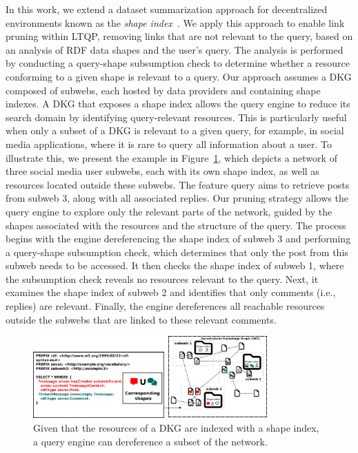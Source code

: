 In this work, we extend a dataset summarization approach for decentralized environments known as the \emph{shape index}~\cite{tam2024opportunitiesshapebasedoptimizationlink}.
We apply this approach to enable link pruning within LTQP, removing links that are not relevant to the query, based on an analysis of RDF data shapes and the user's query.
The analysis is performed by conducting a query-shape subsumption check to determine whether a resource conforming to a given shape is relevant to a query.
Our approach assumes a DKG composed of subwebs, each hosted by data providers and containing shape indexes.
A DKG that exposes a shape index allows the query engine to reduce its search domain by identifying query-relevant resources.
This is particularly useful when only a subset of a DKG is relevant to a given query, for example, in social media applications, where it is rare to query all information about a user.
To illustrate this, we present the example in Figure~\ref{fig:dkg}, which depicts a network of three social media user subwebs, each with its own shape index, as well as resources located outside these subwebs.
The feature query aims to retrieve posts from subweb 3, along with all associated replies.
Our pruning strategy allows the query engine to explore only the relevant parts of the network, guided by the shapes associated with the resources and the structure of the query.
The process begins with the engine dereferencing the shape index of subweb 3 and performing a query-shape subsumption check, which determines that only the post from this subweb needs to be accessed.  
It then checks the shape index of subweb 1, where the subsumption check reveals no resources relevant to the query.  
Next, it examines the shape index of subweb 2 and identifies that only comments (i.e., replies) are relevant.  
Finally, the engine dereferences all reachable resources outside the subwebs that are linked to these relevant comments.

\begin{figure}
   \centering
   \includegraphics[width=0.80\textwidth]{figure/dkg.png}
   \caption{
      Given that the resources of a DKG are indexed with a shape index, a query engine can dereference a subset of the network.
    }
    \label{fig:dkg}
\end{figure}

